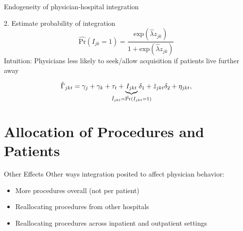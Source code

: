 \documentclass[t]{beamer}
\begin{document}
\begin{frame}{Endogeneity of physician-hospital integration}
{\begin{block}{2. Estimate probability of integration}
            \begin{equation*}
                \hat{\text{Pr}}\left(I_{jk}=1\right) = \frac{\text{exp}\left(\hat{\lambda} z_{jk}\right)}{1+\text{exp}\left(\hat{\lambda} z_{jk}\right)}
            \end{equation*}
            \noindent Intuition: Physicians less likely to seek/allow acquisition if patients live further away
        \end{block}
        \begin{equation*}
            \hat{\Gamma}_{jkt} = \gamma_{j} + \gamma_{k} + \tau_{t} + \underbrace{I_{jkt}}_{\mathclap{\hat{I}_{jkt}=\hat{\text{Pr}}(I_{jkt}=1)}} \delta_{1}  + \tilde{z}_{jkt}\delta_{2} + \eta_{jkt},
        \end{equation*}
    }
\end{frame}


\section{Allocation of Procedures and Patients}
\begin{frame}{Other Effects}
    Other ways integration posited to affect physician behavior:
    \begin{itemize}
        \item More procedures overall (not per patient)
        \item Reallocating procedures from other hospitals
        \item Reallocating procedures across inpatient and outpatient settings
    \end{itemize}
\end{frame}
\end{document}
